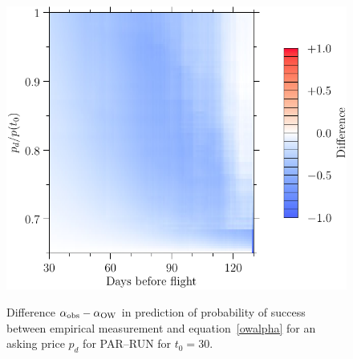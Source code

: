 \documentclass{article}
\begin{document}
\begin{figure}
  \begin{center}
    \includegraphics{pdf/PARRUN_SAT_7_a1_A0}
    \label{PARRUN_SAT_7_a1_A0}
    \caption{Difference $\alpha_{\rm{obs}} - \alpha_{\rm{OW}}$ in
      prediction of probability of success between empirical
      measurement and equation~\eqref{owalpha} for an asking price
      $p_d$ for PAR--RUN for $t_0=30$.}
  \end{center}
\end{figure}
\end{document}
